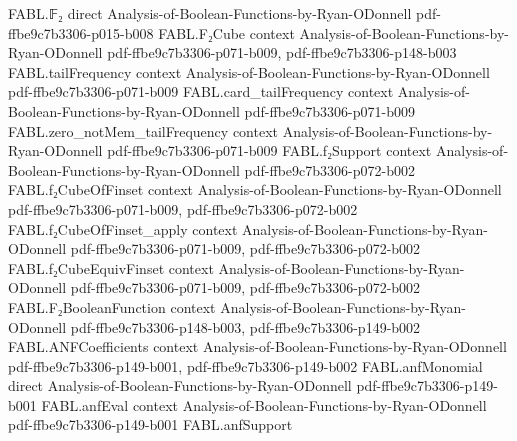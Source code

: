 \begin{theorem}
\label{FABL.degree_index_pos_of_exactly_one_nonzero_slice}
\leanok
{}
\proofstep
  {FABL.𝔽₂}
  {direct}
  {Analysis-of-Boolean-Functions-by-Ryan-ODonnell}
  {pdf-ffbe9c7b3306-p015-b008}
\proofstep
  {FABL.F₂Cube}
  {context}
  {Analysis-of-Boolean-Functions-by-Ryan-ODonnell}
  {pdf-ffbe9c7b3306-p071-b009,
    pdf-ffbe9c7b3306-p148-b003}
\proofstep
  {FABL.tailFrequency}
  {context}
  {Analysis-of-Boolean-Functions-by-Ryan-ODonnell}
  {pdf-ffbe9c7b3306-p071-b009}
\proofstep
  {FABL.card_tailFrequency}
  {context}
  {Analysis-of-Boolean-Functions-by-Ryan-ODonnell}
  {pdf-ffbe9c7b3306-p071-b009}
\proofstep
  {FABL.zero_notMem_tailFrequency}
  {context}
  {Analysis-of-Boolean-Functions-by-Ryan-ODonnell}
  {pdf-ffbe9c7b3306-p071-b009}
\proofstep
  {FABL.f₂Support}
  {context}
  {Analysis-of-Boolean-Functions-by-Ryan-ODonnell}
  {pdf-ffbe9c7b3306-p072-b002}
\proofstep
  {FABL.f₂CubeOfFinset}
  {context}
  {Analysis-of-Boolean-Functions-by-Ryan-ODonnell}
  {pdf-ffbe9c7b3306-p071-b009,
    pdf-ffbe9c7b3306-p072-b002}
\proofstep
  {FABL.f₂CubeOfFinset_apply}
  {context}
  {Analysis-of-Boolean-Functions-by-Ryan-ODonnell}
  {pdf-ffbe9c7b3306-p071-b009,
    pdf-ffbe9c7b3306-p072-b002}
\proofstep
  {FABL.f₂CubeEquivFinset}
  {context}
  {Analysis-of-Boolean-Functions-by-Ryan-ODonnell}
  {pdf-ffbe9c7b3306-p071-b009,
    pdf-ffbe9c7b3306-p072-b002}
\proofstep
  {FABL.F₂BooleanFunction}
  {context}
  {Analysis-of-Boolean-Functions-by-Ryan-ODonnell}
  {pdf-ffbe9c7b3306-p148-b003,
    pdf-ffbe9c7b3306-p149-b002}
\proofstep
  {FABL.ANFCoefficients}
  {context}
  {Analysis-of-Boolean-Functions-by-Ryan-ODonnell}
  {pdf-ffbe9c7b3306-p149-b001,
    pdf-ffbe9c7b3306-p149-b002}
\proofstep
  {FABL.anfMonomial}
  {direct}
  {Analysis-of-Boolean-Functions-by-Ryan-ODonnell}
  {pdf-ffbe9c7b3306-p149-b001}
\proofstep
  {FABL.anfEval}
  {context}
  {Analysis-of-Boolean-Functions-by-Ryan-ODonnell}
  {pdf-ffbe9c7b3306-p149-b001}
\proofstep
  {FABL.anfSupport}

\end{theorem}
